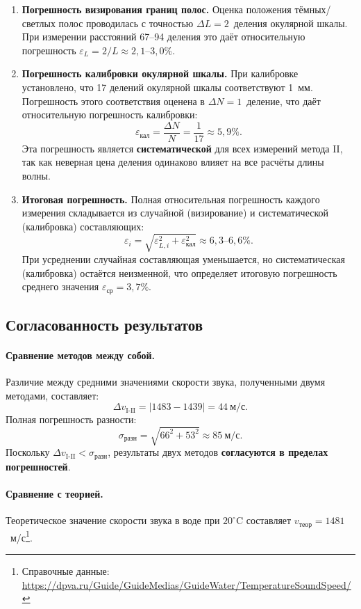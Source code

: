 \documentclass[a4paper]{article}
\begin{document}
\begin{enumerate}
    \item \textbf{Погрешность визирования границ полос.} Оценка положения тёмных/светлых полос проводилась с точностью $\Delta L = 2$~деления окулярной шкалы. При измерении расстояний 67--94 деления это даёт относительную погрешность $\varepsilon_L = 2/L \approx 2{,}1$--$3{,}0\%$.
    
    \item \textbf{Погрешность калибровки окулярной шкалы.} При калибровке установлено, что 17 делений окулярной шкалы соответствуют 1~мм. Погрешность этого соответствия оценена в $\Delta N = 1$~деление, что даёт относительную погрешность калибровки:
    $$
    \varepsilon_{\text{кал}} = \frac{\Delta N}{N} = \frac{1}{17} \approx 5{,}9\%.
    $$
    Эта погрешность является \textbf{систематической} для всех измерений метода II, так как неверная цена деления одинаково влияет на все расчёты длины волны.
    
    \item \textbf{Итоговая погрешность.} Полная относительная погрешность каждого измерения складывается из случайной (визирование) и систематической (калибровка) составляющих:
    $$
    \varepsilon_i = \sqrt{\varepsilon_{L,i}^2 + \varepsilon_{\text{кал}}^2} \approx 6{,}3\text{--}6{,}6\%.
    $$
    При усреднении случайная составляющая уменьшается, но систематическая (калибровка) остаётся неизменной, что определяет итоговую погрешность среднего значения $\varepsilon_{\text{ср}} = 3{,}7\%$.
\end{enumerate}

\subsection{Согласованность результатов}

\paragraph{Сравнение методов между собой.} 
Различие между средними значениями скорости звука, полученными двумя методами, составляет:
$$
\Delta v_{\text{I-II}} = |1483 - 1439| = 44~\text{м/с}.
$$
Полная погрешность разности:
$$
\sigma_{\text{разн}} = \sqrt{66^2 + 53^2} \approx 85~\text{м/с}.
$$
Поскольку $\Delta v_{\text{I-II}} < \sigma_{\text{разн}}$, результаты двух методов \textbf{согласуются в пределах погрешностей}.

\paragraph{Сравнение с теорией.} 
Теоретическое значение скорости звука в воде при $20^\circ$C составляет $v_{\text{теор}} = 1481$~м/с\footnote{Справочные данные: \url{https://dpva.ru/Guide/GuideMedias/GuideWater/TemperatureSoundSpeed/}}. 
\end{document}
